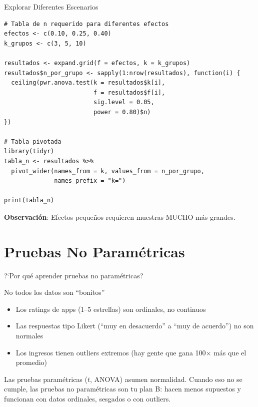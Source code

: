 \documentclass[aspectratio=169, 11pt]{beamer}
\begin{document}
\begin{frame}[fragile]{Explorar Diferentes Escenarios}
\begin{lstlisting}[basicstyle=\ttfamily\scriptsize]
# Tabla de n requerido para diferentes efectos
efectos <- c(0.10, 0.25, 0.40)
k_grupos <- c(3, 5, 10)

resultados <- expand.grid(f = efectos, k = k_grupos)
resultados$n_por_grupo <- sapply(1:nrow(resultados), function(i) {
  ceiling(pwr.anova.test(k = resultados$k[i],
                         f = resultados$f[i],
                         sig.level = 0.05,
                         power = 0.80)$n)
})

# Tabla pivotada
library(tidyr)
tabla_n <- resultados %>%
  pivot_wider(names_from = k, values_from = n_por_grupo,
              names_prefix = "k=")

print(tabla_n)
\end{lstlisting}

\vspace{0.15cm}
\small
\textbf{Observaci\'on}: Efectos peque\~nos requieren muestras MUCHO m\'as grandes.
\end{frame}

\section{Pruebas No Paramétricas}

\begin{frame}{?`Por qu\'e aprender pruebas no param\'etricas?}
\small
\begin{exampleblock}{No todos los datos son ``bonitos''}
\begin{itemize}\setlength{\itemsep}{2pt}
  \item Los ratings de apps (1--5 estrellas) son ordinales, no continuos
  \item Las respuestas tipo Likert (``muy en desacuerdo'' a ``muy de acuerdo'') no son normales
  \item Los ingresos tienen outliers extremos (hay gente que gana 100$\times$ m\'as que el promedio)
\end{itemize}
\end{exampleblock}

\vspace{0.2cm}
Las pruebas param\'etricas ($t$, ANOVA) asumen normalidad. Cuando eso no se cumple, las pruebas no param\'etricas son tu \alert{plan B}: hacen menos supuestos y funcionan con datos ordinales, sesgados o con outliers.
\end{frame}
\end{document}
